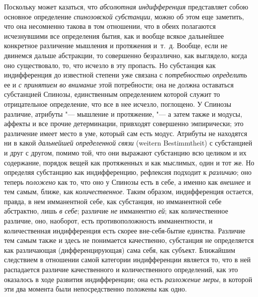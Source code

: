Поскольку может казаться, что {\em абсолютная
индифференция} представляет собою основное определение
{\em спинозовской субстанции}, можно об этом еще
заметить, что она несомненно такова в том отношении, что в обеих полагаются
исчезнувшими все определения бытия, как и вообще всякое дальнейшее
конкретное различение мышления и протяжения и~т.~д. Вообще, если не
двинемся дальше абстракции, то совершенно безразлично, как выглядело, когда
оно существовало, то, что исчезло в эту пропасть. Но субстанция как
индифференция до известной степени уже связана с
{\em потребностью определить} ее и
{\em с принятием во внимание} этой потребности; она не
должна оставаться субстанцией Спинозы, единственным определением которой
служит то отрицательное определение, что все в нее исчезло,
поглощено.
У Спинозы различие, атрибуты "--- мышление и протяжение, "--- а затем также и
модусы, аффекты и все прочие детерминации, привходят совершенно
эмпирически; это различение имеет место в уме, который сам есть модус.
Атрибуты не находятся ни в какой {\em дальнейшей
определенной связи} (weitern Bestimmtheit) с субстанцией и друг с другом,
помимо той, что они выражают субстанцию всю целиком и их содержание,
порядок вещей как протяженных и как мыслимых, один и тот же. Но определяя
субстанцию как индифференцию, рефлексия подходит к {\em различию}; оно теперь
{\em положено} как то, что оно у Спинозы есть в себе, а
именно как {\em внешнее} и тем самым, ближе, как
{\em количественное}. Таким образом, индифференция
остается, правда, в нем имманентной себе, как субстанция, но имманентной
себе абстрактно, лишь {\em в себе}; различие
{\em не} имманентно {\em ей}; как
количественное различие, оно, наоборот, есть противоположность
имманентности, и количественная индифференция есть скорее вне-себя-бытие
единства. Различие тем самым также и здесь не понимается качественно,
субстанция не определяется как различающая (дифференцирующая) сама себя, как
субъект. Ближайшим следствием в отношении самой категории индифференции
является то, что в ней распадается различие качественного и количественного
определений, как это оказалось в ходе развития индифференции; она есть
{\em разложение меры}, в которой эти два момента были
непосредственно положены как одно.

